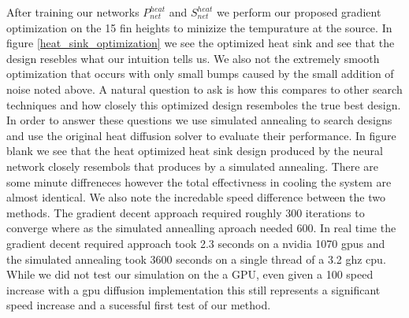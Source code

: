 \documentclass{article} %
\begin{document}
After training our networks $P^{heat}_{net}$ and $S^{heat}_{net}$ we perform our proposed gradient optimization on the 15 fin heights to minizize the tempurature at the source. In figure \ref{heat_sink_optimization} we see the optimized heat sink and see that the design resebles what our intuition tells us. We also not the extremely smooth optimization that occurs with only small bumps caused by the small addition of noise noted above. A natural question to ask is how this compares to other search techniques and how closely this optimized design resemboles the true best design. In order to answer these questions we use simulated annealing to search designs and use the original heat diffusion solver to evaluate their performance. In figure blank we see that the heat optimized heat sink design produced by the neural network closely resembols that produces by a simulated annealing. There are some minute diffreneces however the total effectivness in cooling the system are almost identical. We also note the incredable speed difference between the two methods. The gradient decent approach required roughly 300 iterations to converge where as the simulated annealling aproach needed 600. In real time the gradient decent required approach took 2.3 seconds on a nvidia 1070 gpus and the simulated annealing took 3600 seconds on a single thread of a 3.2 ghz cpu. While we did not test our simulation on the a GPU, even given a 100 speed increase with a gpu diffusion implementation this still represents a significant speed increase and a sucessful first test of our method.
\end{document}
